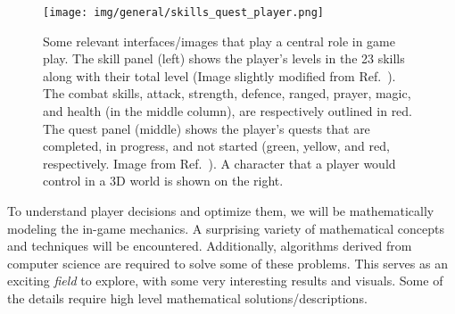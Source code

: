\begin{figure}[h!]
	\centering
	\texttt{[image: img/general/skills\_quest\_player.png]}
	\caption{
		Some relevant interfaces/images that play a central role in game play. The skill panel (left) shows the player's levels in the 23 skills along with their total level (Image slightly modified from Ref.~\cite{wiki:skills}). The combat skills, attack, strength, defence, ranged, prayer, magic, and health (in the middle column), are respectively outlined in red. The quest panel (middle) shows the player's quests that are completed, in progress, and not started (green, yellow, and red, respectively. Image from Ref.~\cite{wiki:quests}). A character that a player would control in a 3D world is shown on the right.
	}
	\label{fig:skills_quest_player}
\end{figure}

\newpage
To understand player decisions and optimize them, we will be mathematically modeling the in-game mechanics. A surprising variety of mathematical concepts and techniques will be encountered. Additionally, algorithms derived from computer science are required to solve some of these problems. This serves as an exciting \textit{field} to explore, with some very interesting results and visuals. Some of the details require high level mathematical solutions/descriptions. 
\vspace{2em}
\newline

